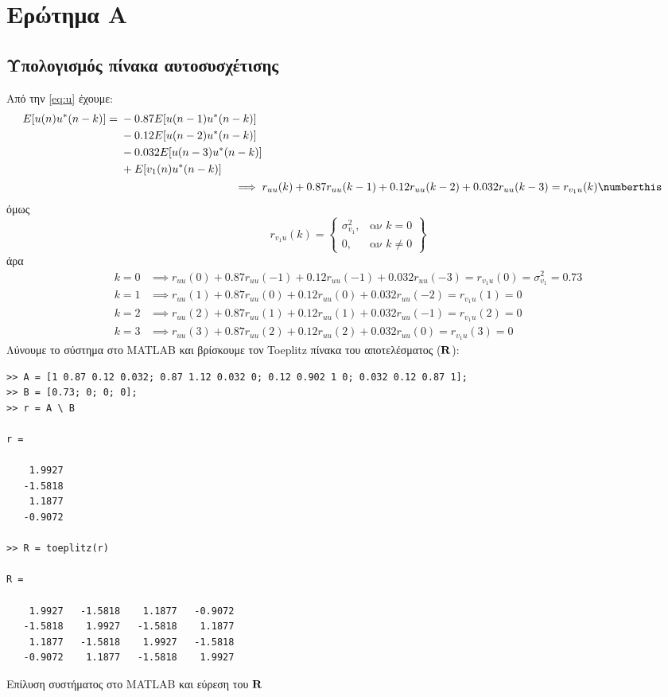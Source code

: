 \section{Ερώτημα Α}
\subsection{Υπολογισμός πίνακα αυτοσυσχέτισης}
Από την \eqref{eq:u} έχουμε:
\begin{align*}
\begin{split}
E[u(n) u^*(n-k)]={}&
-0.87E[u(n-1) u^*(n-k)]\\
&-0.12E[u(n-2) u^*(n-k)]\\
&-0.032E[u(n-3) u^*(n-k)]\\
&+E[v_1(n) u^*(n-k)]\\
\end{split}\\
\implies{}&
r_{uu}(k)
+0.87r_{uu}(k-1)
+0.12r_{uu}(k-2)
+0.032r_{uu}(k-3)
= r_{{v_1}u}(k)\numberthis
\end{align*}
όμως
\begin{equation}
r_{{v_1}u}(k) = \left\{
    \begin{array}{lr}
        \sigma_{v_1}^2,& \text{αν }k = 0\\
        0,& \text{αν }k \neq 0
    \end{array}
\right\}
\end{equation}
άρα
\begin{align*}
k = 0 &\implies r_{uu}(0) + 0.87r_{uu}(-1) + 0.12r_{uu}(-1) + 0.032r_{uu}(-3) = r_{{v_1}u}(0) = \sigma_{v_1}^2 = 0.73\\
k = 1 &\implies r_{uu}(1) + 0.87r_{uu}(0) + 0.12r_{uu}(0) + 0.032r_{uu}(-2) = r_{{v_1}u}(1) = 0\\
k = 2 &\implies r_{uu}(2) + 0.87r_{uu}(1) + 0.12r_{uu}(1) + 0.032r_{uu}(-1) = r_{{v_1}u}(2) = 0\\
k = 3 &\implies r_{uu}(3) + 0.87r_{uu}(2) + 0.12r_{uu}(2) + 0.032r_{uu}(0) = r_{{v_1}u}(3) = 0
\end{align*}
Λύνουμε το σύστημα στο MATLAB και βρίσκουμε τον Toeplitz πίνακα του αποτελέσματος ($\mathbf{R}$):
\begin{code}
\begin{verbatim}
>> A = [1 0.87 0.12 0.032; 0.87 1.12 0.032 0; 0.12 0.902 1 0; 0.032 0.12 0.87 1];
>> B = [0.73; 0; 0; 0];
>> r = A \ B

r =

    1.9927
   -1.5818
    1.1877
   -0.9072

>> R = toeplitz(r)

R =

    1.9927   -1.5818    1.1877   -0.9072
   -1.5818    1.9927   -1.5818    1.1877
    1.1877   -1.5818    1.9927   -1.5818
   -0.9072    1.1877   -1.5818    1.9927
\end{verbatim}
\caption{Επίλυση συστήματος στο MATLAB και εύρεση του $\mathbf{R}$}
\end{code}

